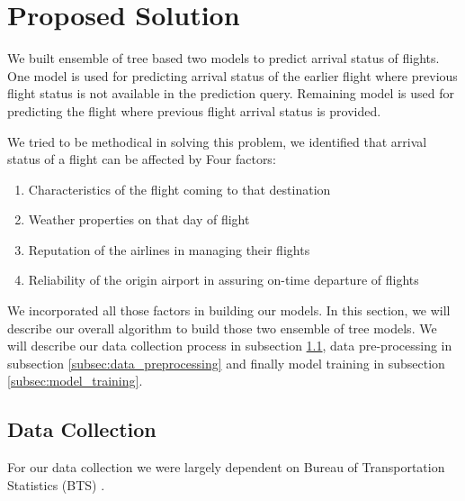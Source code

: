 
\section{Proposed Solution}
\label{sec:solution}

We built ensemble of tree based two models to predict arrival status of flights.
One model is used for predicting arrival status of the earlier flight where previous flight status is not available in the prediction query.
Remaining model is used for predicting the flight where previous flight arrival status is provided. 

We tried to be methodical in solving this problem, we identified that arrival status of a flight can be affected by Four factors:
\begin{enumerate}
	\item Characteristics of the flight coming to that destination
	\item Weather properties on that day of  flight
	\item Reputation of the airlines in managing their flights
	\item Reliability of the origin airport in assuring on-time departure of flights
\end{enumerate}
We incorporated all those factors in building our models.
In this section, we will describe our overall algorithm to build those two ensemble of tree models. We will describe our data collection process in subsection \ref{subsec:data_collection}, data pre-processing in subsection \ref{subsec:data_preprocessing} and finally model training in subsection \ref{subsec:model_training}.

%

\subsection{Data Collection}
\label{subsec:data_collection}
For our data collection we were largely dependent on Bureau of Transportation Statistics (BTS) \cite{BTS}.

